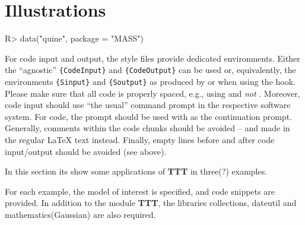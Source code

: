 \documentclass[article]{jss}
\newcommand{\fct}[1]{\code{#1()}}
\begin{document}

\section{Illustrations} \label{sec:illustrations}

%
\begin{CodeChunk}
\begin{CodeInput}
R> data("quine", package = "MASS")
\end{CodeInput}
\end{CodeChunk}

\begin{leftbar}
For code input and output, the style files provide dedicated environments.
Either the ``agnostic'' \verb|{CodeInput}| and \verb|{CodeOutput}| can be used
or, equivalently, the environments \verb|{Sinput}| and \verb|{Soutput}| as
produced by \fct{Sweave} or  when using the 
hook. Please make sure that all code is properly spaced, e.g., using
 and \emph{not} . Moreover, code input should
use ``the usual'' command prompt in the respective software system. For
 code, the prompt  should be used with  as
the continuation prompt. Generally, comments within the code chunks should be
avoided -- and made in the regular {\LaTeX} text instead. Finally, empty lines
before and after code input/output should be avoided (see above).
\end{leftbar}
In this section its show some applications of \textbf{TTT} in three(?) examples. 

For each example,
the model of interest is specified, and code snippets are provided. In addition to the module
\textbf{TTT}, the libraries collections, dateutil and mathematics(Gaussian) are also required.
\end{document}
